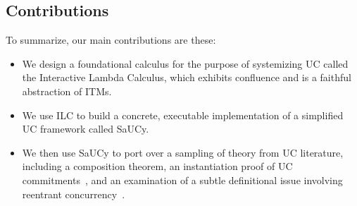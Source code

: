 \subsection{Contributions}
\label{subsec:contributions}

To summarize, our main contributions are these:

\begin{itemize}[leftmargin=*]
  \item We design a foundational calculus for the purpose of systemizing UC
    called the Interactive Lambda Calculus, which exhibits confluence and is a
    faithful abstraction of ITMs.
  \item We use ILC to build a concrete, executable implementation of a
    simplified UC framework called SaUCy.
  \item We then use SaUCy to port over a sampling of theory from UC literature,
    including a composition theorem, an instantiation proof of UC
    commitments~\cite{canetti2001commitments}, and an examination of a subtle
    definitional issue involving reentrant
    concurrency~\cite{camenisch2016universal}.
\end{itemize}
